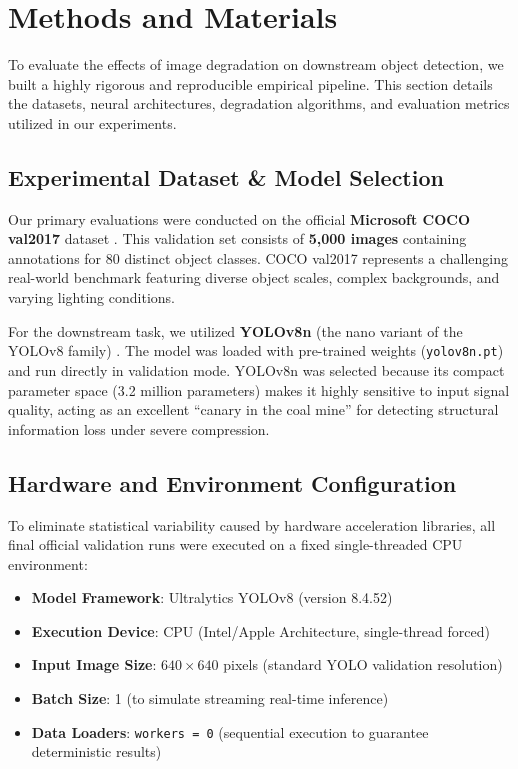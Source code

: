 \documentclass[12pt, a4paper]{article}
\begin{document}
\section{Methods and Materials}
To evaluate the effects of image degradation on downstream object detection, we built a highly rigorous and reproducible empirical pipeline. This section details the datasets, neural architectures, degradation algorithms, and evaluation metrics utilized in our experiments.

\subsection{Experimental Dataset \& Model Selection}
Our primary evaluations were conducted on the official \textbf{Microsoft COCO val2017} dataset \cite{lin2014}. This validation set consists of \textbf{5,000 images} containing annotations for 80 distinct object classes. COCO val2017 represents a challenging real-world benchmark featuring diverse object scales, complex backgrounds, and varying lighting conditions.

For the downstream task, we utilized \textbf{YOLOv8n} (the nano variant of the YOLOv8 family) \cite{jocher2023}. The model was loaded with pre-trained weights (\texttt{yolov8n.pt}) and run directly in validation mode. YOLOv8n was selected because its compact parameter space (3.2 million parameters) makes it highly sensitive to input signal quality, acting as an excellent ``canary in the coal mine'' for detecting structural information loss under severe compression.

\subsection{Hardware and Environment Configuration}
To eliminate statistical variability caused by hardware acceleration libraries, all final official validation runs were executed on a fixed single-threaded CPU environment:
\begin{itemize}
    \item \textbf{Model Framework}: Ultralytics YOLOv8 (version 8.4.52)
    \item \textbf{Execution Device}: CPU (Intel/Apple Architecture, single-thread forced)
    \item \textbf{Input Image Size}: $640\times640$ pixels (standard YOLO validation resolution)
    \item \textbf{Batch Size}: 1 (to simulate streaming real-time inference)
    \item \textbf{Data Loaders}: \texttt{workers = 0} (sequential execution to guarantee deterministic results)
\end{itemize}
\end{document}

